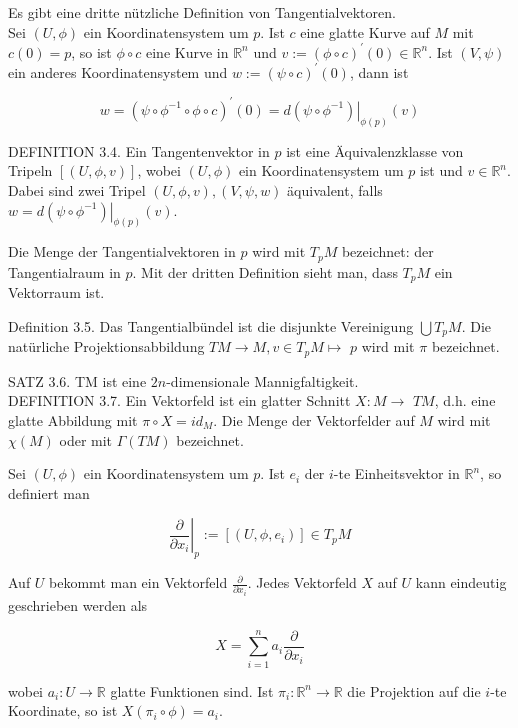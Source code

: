 \documentclass[10pt]{article}
\begin{document}
Es gibt eine dritte nützliche Definition von Tangentialvektoren.\\
Sei $(U, \phi)$ ein Koordinatensystem um $p$. Ist $c$ eine glatte Kurve auf $M$ mit $c(0)=p$, so ist $\phi \circ c$ eine Kurve in $\mathbb{R}^{n}$ und $v:=(\phi \circ c)^{\prime}(0) \in \mathbb{R}^{n}$. Ist $(V, \psi)$ ein anderes Koordinatensystem und $w:=(\psi \circ c)^{\prime}(0)$, dann ist

$$
w=\left(\psi \circ \phi^{-1} \circ \phi \circ c\right)^{\prime}(0)=\left.d\left(\psi \circ \phi^{-1}\right)\right|_{\phi(p)}(v)
$$

DEFINITION 3.4. Ein Tangentenvektor in $p$ ist eine Äquivalenzklasse von Tripeln $[(U, \phi, v)]$, wobei $(U, \phi)$ ein Koordinatensystem um $p$ ist und $v \in \mathbb{R}^{n}$. Dabei sind zwei Tripel $(U, \phi, v),(V, \psi, w)$ äquivalent, falls $w=\left.d\left(\psi \circ \phi^{-1}\right)\right|_{\phi(p)}(v)$.

Die Menge der Tangentialvektoren in $p$ wird mit $T_{p} M$ bezeichnet: der Tangentialraum in $p$. Mit der dritten Definition sieht man, dass $T_{p} M$ ein Vektorraum ist.

Definition 3.5. Das Tangentialbündel ist die disjunkte Vereinigung $\bigcup T_{p} M$. Die natürliche Projektionsabbildung $T M \rightarrow M, v \in T_{p} M \mapsto$ $p$ wird mit $\pi$ bezeichnet.

SATZ 3.6. TM ist eine $2 n$-dimensionale Mannigfaltigkeit.\\
DEFINITION 3.7. Ein Vektorfeld ist ein glatter Schnitt $X: M \rightarrow$ $T M$, d.h. eine glatte Abbildung mit $\pi \circ X=i d_{M}$. Die Menge der Vektorfelder auf $M$ wird mit $\chi(M)$ oder mit $\Gamma(T M)$ bezeichnet.

Sei $(U, \phi)$ ein Koordinatensystem um $p$. Ist $e_{i}$ der $i$-te Einheitsvektor in $\mathbb{R}^{n}$, so definiert man

$$
\left.\frac{\partial}{\partial x_{i}}\right|_{p}:=\left[\left(U, \phi, e_{i}\right)\right] \in T_{p} M
$$

Auf $U$ bekommt man ein Vektorfeld $\frac{\partial}{\partial x_{i}}$. Jedes Vektorfeld $X$ auf $U$ kann eindeutig geschrieben werden als

$$
X=\sum_{i=1}^{n} a_{i} \frac{\partial}{\partial x_{i}}
$$

wobei $a_{i}: U \rightarrow \mathbb{R}$ glatte Funktionen sind. Ist $\pi_{i}: \mathbb{R}^{n} \rightarrow \mathbb{R}$ die Projektion auf die $i$-te Koordinate, so ist $X\left(\pi_{i} \circ \phi\right)=a_{i}$.
\end{document}

